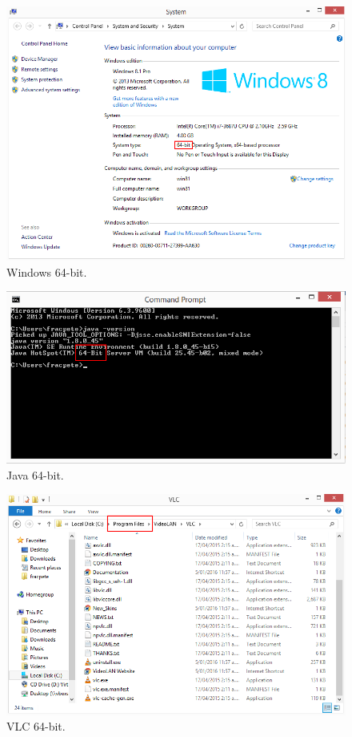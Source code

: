 \documentclass[a4paper]{book}
\begin{document}
\begin{figure}[htb]
  \centering
  \includegraphics[width=12.0cm]{images/windows64bit.png}
  \caption{Windows 64-bit.}
  \label{windows64bit}
\end{figure}

\begin{figure}[htb]
  \centering
  \includegraphics[width=12.0cm]{images/java64bit.png}
  \caption{Java 64-bit.}
  \label{java64bit}
\end{figure}

\begin{figure}[htb]
  \centering
  \includegraphics[width=12.0cm]{images/vlc64bit.png}
  \caption{VLC 64-bit.}
  \label{vlc64bit}
\end{figure}
\end{document}
